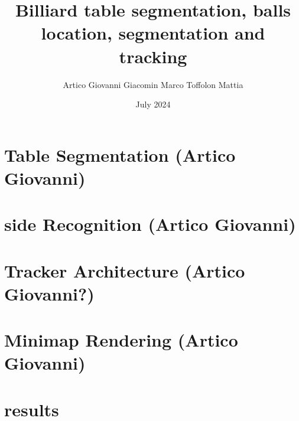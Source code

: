 \documentclass{article}
\title{Billiard table segmentation, balls location, segmentation and tracking
}
\author{Artico Giovanni Giacomin Marco Toffolon Mattia}
\date{July 2024}
\begin{document}
\maketitle

\section*{Table Segmentation (Artico Giovanni)}

\section*{side Recognition (Artico Giovanni)}

\section*{Tracker Architecture (Artico Giovanni?)}

\section*{Minimap Rendering (Artico Giovanni)}

\section*{results}

\end{document}
